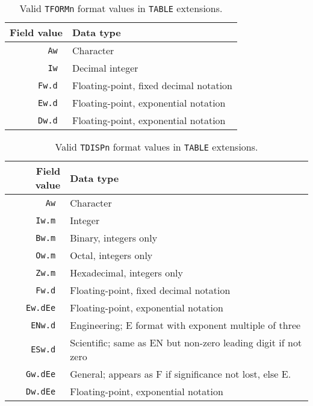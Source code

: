 \documentclass[onecolumn]{aa}
\begin{document}
\begin{table}
\caption{Valid {\tt TFORMn} format values in {\tt TABLE} extensions.}
\label{t:tabF}
\begin{center}
\begin{tabular}{rl} 
\hline \hline
Field value & Data type  \\
\hline
            \tt Aw    &  Character                                  \\
           \tt Iw    &  Decimal integer                                    \\
           \tt Fw.d  &  Floating-point, fixed decimal notation    \\
           \tt Ew.d  &  Floating-point, exponential notation \\
           \tt Dw.d  &  Floating-point, exponential notation \\
\hline
\end{tabular}
\end{center}
\end{table}



\begin{table*}
\centering
\caption{Valid {\tt TDISPn} format values in {\tt TABLE} extensions.}
\label{t:tableD}
\begin{tabular}{rl} 
\hline \hline
Field value & Data type  \\
\hline
        \tt Aw     &  Character                                  \\
        \tt Iw.m   &  Integer                                    \\
        \tt Bw.m   &  Binary, integers only                       \\
        \tt Ow.m   &  Octal, integers only                        \\
        \tt Zw.m   &  Hexadecimal, integers only                  \\
        \tt Fw.d   &  Floating-point, fixed decimal notation       \\
        \tt Ew.dEe &  Floating-point, exponential notation \\
        \tt ENw.d  &  Engineering; E format with exponent multiple of three \\
        \tt ESw.d  &  Scientific; same as EN but non-zero leading digit 
			if not zero \\
        \tt Gw.dEe &  General; appears as F if significance not lost, else E. \\
        \tt Dw.dEe &  Floating-point, exponential notation \\
\hline
\end{tabular}
\end{table*}
\end{document}
